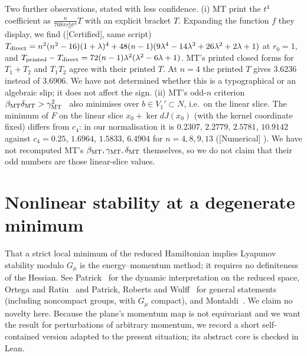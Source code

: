 \documentclass[11pt]{article}
\numberwithin{equation}{section}
\theoremstyle{definition}
\theoremstyle{remark}
\DeclareRobustCommand{\code}[1]{\path{#1}}
\newcommand{\status}[1]{\textsf{[#1]}}
\begin{document}
Two further observations, stated with less confidence. (i) MT print the $t^4$ coefficient as
$\frac{n}{768\pi r_0^4\sigma^4}T$ with an explicit bracket $T$. Expanding the function $f$ they display, we
find (\status{Certified}, same script) $T_{\rm direct}=n^2(n^2-16)(1+\lambda)^4+48(n-1)(9\lambda^4-14\lambda^3+26\lambda^2+2\lambda+1)$
at $r_0=1$, and $T_{\rm printed}-T_{\rm direct}=72(n-1)\lambda^2(\lambda^2-6\lambda+1)$. MT's printed
closed forms for $T_1+T_2$ and $T_1T_2$ agree with their printed $T$. At $n=4$ the printed $T$ gives $3.6236$
instead of $3.6906$. We have not determined whether this is a typographical or an algebraic slip; it does
not affect the sign. (ii) MT's odd-$n$ criterion $\beta_{\rm MT}\delta_{\rm MT}>\gamma_{\rm MT}^2$~\cite[(3.9)]{MT} also minimises over
$b\in V_1'\subset N$, i.e.\ on the linear slice. The minimum of $F$ on the linear slice
$x_0+\ker dJ(x_0)$ (with the kernel coordinate fixed) differs from $c_4$: in our normalisation it is
$0.2307$, $2.2779$, $2.5781$, $10.9142$ against $c_4=0.25$, $1.6964$, $1.5833$, $6.4904$ for $n=4,8,9,13$
(\status{Numerical} \code{code/c4_slice.py}). We have not recomputed MT's $\beta_{\rm MT},\gamma_{\rm MT},\delta_{\rm MT}$ themselves,
so we do not claim that their odd numbers are those linear-slice values.

\section{Nonlinear stability at a degenerate minimum}\label{sec:nonlinear}

That a strict local minimum of the reduced Hamiltonian implies Lyapunov stability modulo $G_\mu$ is the
energy--momentum method; it requires no definiteness of the Hessian. See Patrick~\cite{Patrick92} for the
dynamic interpretation on the reduced space, Ortega and Ratiu~\cite{OR99,OR04} and Patrick, Roberts and
Wulff~\cite{PRW} for general statements (including noncompact groups, with $G_\mu$ compact), and
Montaldi~\cite{Montaldi97}. We claim no novelty here. Because the plane's momentum map is not equivariant
and we want the result for perturbations of arbitrary momentum, we record a short self-contained version
adapted to the present situation; its abstract core is checked in Lean.
\end{document}
